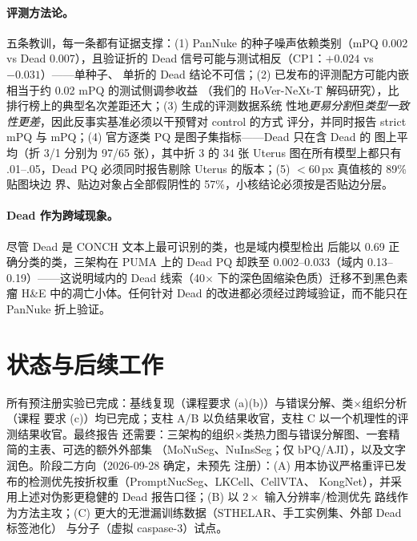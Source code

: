 \documentclass[11pt]{article}
\begin{document}
\paragraph{评测方法论。}五条教训，每一条都有证据支撑：(1) PanNuke 的种子噪声依赖类别（mPQ 0.002 vs
Dead 0.007），且验证折的 Dead 信号可能与测试相反（CP1：$+0.024$ vs $-0.031$）——单种子、
单折的 Dead 结论不可信；(2) 已发布的评测配方可能内嵌相当于约 0.02 mPQ 的测试侧调参收益
（我们的 HoVer-NeXt-T 解码研究），比排行榜上的典型名次差距还大；(3) 生成的评测数据系统
性地\emph{更易分割}但\emph{类型一致性更差}，因此反事实基准必须以干预臂对 control 的方式
评分，并同时报告 strict mPQ 与 mPQ；(4) 官方逐类 PQ 是图子集指标——Dead 只在含 Dead 的
图上平均（折 3/1 分别为 97/65 张），其中折 3 的 34 张 Uterus 图在所有模型上都只有
.01--.05，Dead PQ 必须同时报告剔除 Uterus 的版本；(5) $<$60\,px 真值核的 89\% 贴图块边
界、贴边对象占全部假阴性的 57\%，小核结论必须按是否贴边分层。

\paragraph{Dead 作为跨域现象。}尽管 Dead 是 CONCH 文本上最可识别的类，也是域内模型检出
后能以 0.69 正确分类的类，三架构在 PUMA 上的 Dead PQ 却跌至 0.002--0.033（域内
0.13--0.19）——这说明域内的
Dead 线索（40$\times$ 下的深色固缩染色质）迁移不到黑色素瘤 H\&E 中的凋亡小体。任何针对
Dead 的改进都必须经过跨域验证，而不能只在 PanNuke 折上验证。

\section{状态与后续工作}
\label{sec:status}

所有预注册实验已完成：基线复现（课程要求 (a)(b)）与错误分解、类$\times$组织分析（课程
要求 (c)）均已完成；支柱 A/B 以负结果收官，支柱 C 以一个机理性的评测结果收官。最终报告
还需要：三架构的组织$\times$类热力图与错误分解图、一套精简的主表、可选的额外外部集
（MoNuSeg、NuInsSeg；仅 bPQ/AJI），以及文字润色。阶段二方向（2026-09-28 确定，未预先
注册）：(A) 用本协议严格重评已发布的检测优先按折权重（PromptNucSeg、LKCell、CellVTA、
KongNet），并采用上述对伪影更稳健的 Dead 报告口径；(B) 以 $2\times$ 输入分辨率/检测优先
路线作为方法主攻；(C) 更大的无泄漏训练数据（STHELAR、手工实例集、外部 Dead 标签池化）
与分子（虚拟 caspase-3）试点。
\end{document}
